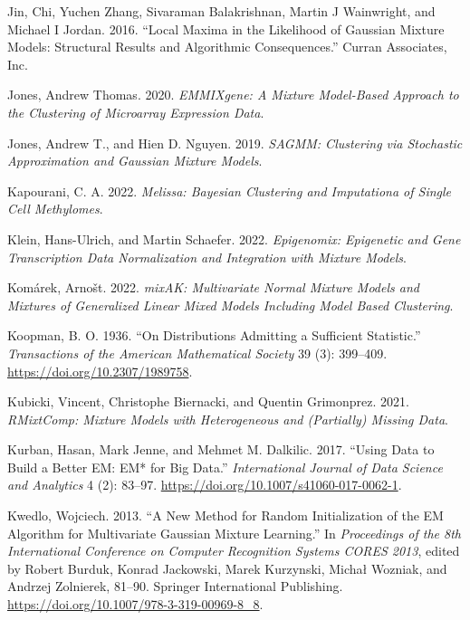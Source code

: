 \begin{CSLReferences}{1}{0}
\leavevmode{}%
Jin, Chi, Yuchen Zhang, Sivaraman Balakrishnan, Martin J Wainwright, and Michael I Jordan. 2016. {``Local {Maxima} in the {Likelihood} of {Gaussian Mixture Models}: {Structural Results} and {Algorithmic Consequences}.''} {Curran Associates, Inc.}

\leavevmode{}%
Jones, Andrew Thomas. 2020. \emph{EMMIXgene: A Mixture Model-Based Approach to the Clustering of Microarray Expression Data}.

\leavevmode{}%
Jones, Andrew T., and Hien D. Nguyen. 2019. \emph{SAGMM: Clustering via Stochastic Approximation and Gaussian Mixture Models}.

\leavevmode{}%
Kapourani, C. A. 2022. \emph{Melissa: Bayesian Clustering and Imputationa of Single Cell Methylomes}.

\leavevmode{}%
Klein, Hans-Ulrich, and Martin Schaefer. 2022. \emph{Epigenomix: Epigenetic and Gene Transcription Data Normalization and Integration with Mixture Models}.

\leavevmode{}%
Komárek, Arnošt. 2022. \emph{mixAK: Multivariate Normal Mixture Models and Mixtures of Generalized Linear Mixed Models Including Model Based Clustering}.

\leavevmode{}%
Koopman, B. O. 1936. {``On {Distributions Admitting} a {Sufficient Statistic}.''} \emph{Transactions of the American Mathematical Society} 39 (3): 399--409. \url{https://doi.org/10.2307/1989758}.

\leavevmode{}%
Kubicki, Vincent, Christophe Biernacki, and Quentin Grimonprez. 2021. \emph{RMixtComp: Mixture Models with Heterogeneous and (Partially) Missing Data}.

\leavevmode{}%
Kurban, Hasan, Mark Jenne, and Mehmet M. Dalkilic. 2017. {``Using Data to Build a Better {EM}: {EM}* for Big Data.''} \emph{International Journal of Data Science and Analytics} 4 (2): 83--97. \url{https://doi.org/10.1007/s41060-017-0062-1}.

\leavevmode{}%
Kwedlo, Wojciech. 2013. {``A {New Method} for {Random Initialization} of the {EM Algorithm} for {Multivariate Gaussian Mixture Learning}.''} In \emph{Proceedings of the {8th International Conference} on {Computer Recognition Systems CORES 2013}}, edited by Robert Burduk, Konrad Jackowski, Marek Kurzynski, Michał Wozniak, and Andrzej Zolnierek, 81--90. {Springer International Publishing}. \url{https://doi.org/10.1007/978-3-319-00969-8_8}.


\end{CSLReferences}
